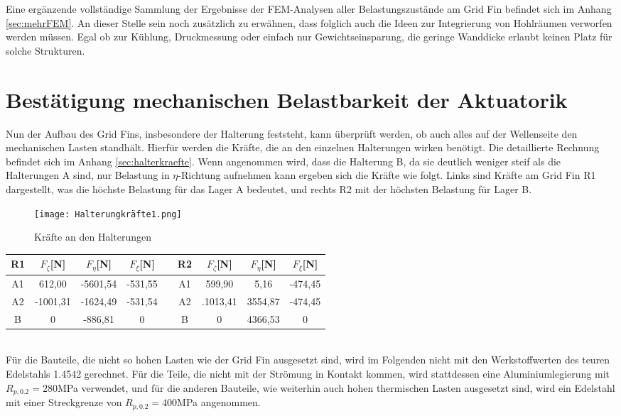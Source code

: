 \\~\\
Eine ergänzende vollständige Sammlung der Ergebnisse der FEM-Analysen aller Belastungszustände am Grid Fin befindet sich im Anhang \ref{sec:mehrFEM}.
An dieser Stelle sein noch zusätzlich zu erwähnen, dass folglich auch die Ideen zur Integrierung von Hohlräumen verworfen werden müssen. Egal ob zur Kühlung, Druckmessung oder einfach nur Gewichtseinsparung, die geringe Wanddicke erlaubt keinen Platz für solche Strukturen.
\section{Bestätigung mechanischen Belastbarkeit der Aktuatorik}
Nun der Aufbau des Grid Fins, insbesondere der Halterung feststeht, kann überprüft werden, ob auch alles auf der Wellenseite den mechanischen Lasten standhält. Hierfür werden die Kräfte, die an den einzelnen Halterungen wirken benötigt. Die detaillierte Rechnung befindet sich im Anhang \ref{sec:halterkraefte}. Wenn angenommen wird, dass die Halterung B, da sie deutlich weniger steif als die Halterungen A sind, nur Belastung in $\eta$-Richtung aufnehmen kann ergeben sich die Kräfte wie folgt. Links sind Kräfte am Grid Fin R1 dargestellt, was die höchste Belastung für das Lager A bedeutet, und rechts R2 mit der höchsten Belastung für Lager B.
\begin{figure}[h] 
	\centering
	\texttt{[image: Halterungkräfte1.png]}
	\caption{Kräfte an den Halterungen}
\end{figure}
\begin{table}[h] 
	\centering 
	\begin{tabular}{c|c|c|cc||c|c|c|c} 
		\textbf{R1}&$F_{\zeta}$[N]&$F_\eta$[N]&$F_\xi$[N]&&\textbf{R2}&$F_{\zeta}$[N]&$F_\eta$[N]&$F_\xi$[N]\\ 
		\hline 
		A1& 612,00&-5601,54&-531,55&&A1&599,90&5,16&-474,45\\
		A2&-1001,31&-1624,49&-531,54&&A2&.1013,41&3554,87&-474,45\\
		B&0&-886,81&0&&B&0&4366,53&0\\
	\end{tabular}
\end{table} \\
Für die Bauteile, die nicht so hohen Lasten wie der Grid Fin ausgesetzt sind, wird im Folgenden nicht mit den Werkstoffwerten des teuren Edelstahls 1.4542 gerechnet. Für die Teile, die nicht mit der Strömung in Kontakt kommen, wird stattdessen eine Aluminiumlegierung mit $R_{p,0.2} = 280$MPa verwendet, und für die anderen Bauteile, wie weiterhin auch hohen thermischen Lasten ausgesetzt sind, wird ein Edelstahl mit einer Streckgrenze von $R_{p,0.2} = 400$MPa angenommen.
